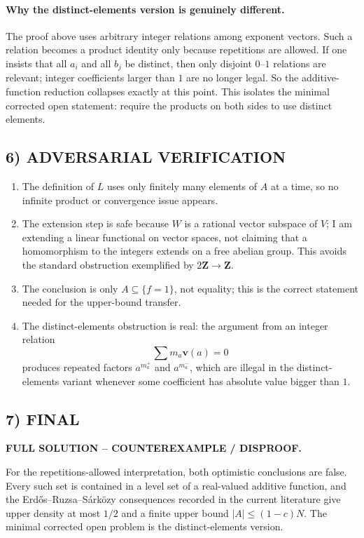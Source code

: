 \paragraph{Why the distinct-elements version is genuinely different.}
The proof above uses arbitrary integer relations among exponent vectors. Such a relation becomes a product identity only because repetitions are allowed. If one insists that all $a_i$ and all $b_j$ be distinct, then only disjoint $0$--$1$ relations are relevant; integer coefficients larger than $1$ are no longer legal. So the additive-function reduction collapses exactly at this point. This isolates the minimal corrected open statement: require the products on both sides to use distinct elements.

\subsection*{6) ADVERSARIAL VERIFICATION}
\begin{enumerate}
\item The definition of $L$ uses only finitely many elements of $A$ at a time, so no infinite product or convergence issue appears.
\item The extension step is safe because $W$ is a rational vector subspace of $V$; I am extending a linear functional on vector spaces, not claiming that a homomorphism to the integers extends on a free abelian group. This avoids the standard obstruction exemplified by $2\mathbf Z \to \mathbf Z$.
\item The conclusion is only $A \subseteq \{f=1\}$, not equality; this is the correct statement needed for the upper-bound transfer.
\item The distinct-elements obstruction is real: the argument from an integer relation
\[
 \sum m_a \mathbf v(a)=0
\]
produces repeated factors $a^{m_a^+}$ and $a^{m_a^-}$, which are illegal in the distinct-elements variant whenever some coefficient has absolute value bigger than $1$.
\end{enumerate}

\subsection*{7) FINAL}
\textbf{FULL SOLUTION -- COUNTEREXAMPLE / DISPROOF.}

For the repetitions-allowed interpretation, both optimistic conclusions are false. Every such set is contained in a level set of a real-valued additive function, and the Erd\H{o}s--Ruzsa--S\'ark\"ozy consequences recorded in the current literature give upper density at most $1/2$ and a finite upper bound $|A| \le (1-c)N$. The minimal corrected open problem is the distinct-elements version.

